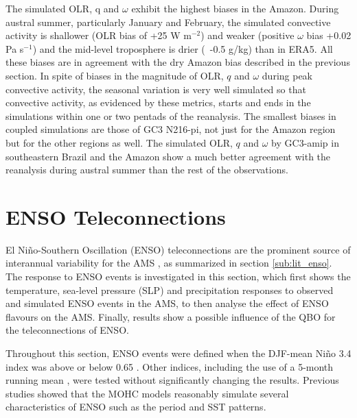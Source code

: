 The simulated OLR, q and $\omega$ exhibit the highest biases in the Amazon. During austral summer, particularly January and February, the simulated convective activity is shallower (OLR bias of +25 W m$^{-2}$) and weaker (positive $\omega$ bias +0.02 Pa s$^{-1}$) and the mid-level troposphere is drier (~-0.5 g/kg) than in ERA5. All these biases are in agreement with the dry Amazon bias described in the previous section. In spite of biases in the magnitude of OLR, $q$ and $\omega$ during peak convective activity, the seasonal variation is very well simulated so that convective activity, as evidenced by these metrics, starts and ends in the simulations within one or two pentads of the reanalysis. The smallest biases in coupled simulations are those of GC3 N216-pi, not just for the Amazon region but for the other regions as well.  The simulated OLR, $q$ and $\omega$ by GC3-amip in southeastern Brazil and the Amazon show a much better agreement with the reanalysis during austral summer than the rest of the observations.  


\section{ENSO Teleconnections}\label{sq:enso1}





El Ni\~no-Southern Oscillation (ENSO) teleconnections are the prominent source of interannual variability for the AMS \citep{vera2006}, as summarized in section \ref{sub:lit_enso}.
The response to ENSO events is investigated in this section, which first shows the temperature, sea-level pressure (SLP) and precipitation responses  to observed and simulated ENSO events in the AMS, to then analyse the effect of ENSO flavours on the AMS. Finally, results show a possible influence of the QBO for the teleconnections of ENSO. 

Throughout this section, ENSO events were defined when the DJF-mean Ni\~no 3.4 index was above or below 0.65 \citep{trenberth1997}. Other indices, including the use of a 5-month running mean \citep{trenberth1998}, were tested without significantly changing the results.   Previous studies \citep[e.g.][]{menary2018,kuhlbrodt2018}  showed that the MOHC models reasonably simulate several characteristics of ENSO such as the period and SST patterns.   



